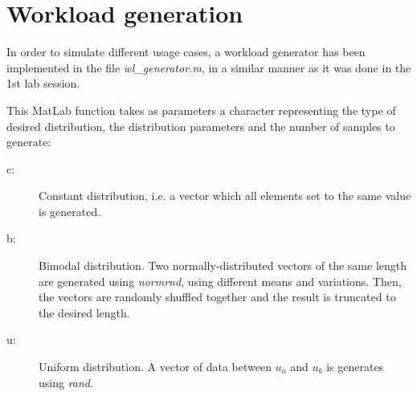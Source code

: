 \section{Workload generation}
In order to simulate different usage cases, a workload generator
has been implemented in the file \emph{wl\_generator.m}, in a similar manner as it was done in the 1st lab session.

This MatLab function takes as parameters a character representing the type of desired distribution, the distribution parameters and the number of samples to generate:

\begin{description}
\item[c:] Constant distribution, i.e. a vector which all elements set to the same value is generated.
\item[b:] Bimodal distribution. Two normally-distributed vectors of the same length are generated using \emph{normrnd}, using different means and variations. Then, the vectors are randomly shuffled together and the result is truncated to the desired length.
\item[u:] Uniform distribution. A vector of data between $u_a$ and $u_b$ is generates using \emph{rand}.
\end{description}


